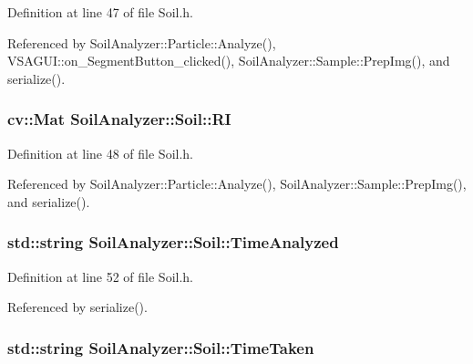 Definition at line 47 of file Soil.\+h.



Referenced by Soil\+Analyzer\+::\+Particle\+::\+Analyze(), V\+S\+A\+G\+U\+I\+::on\+\_\+\+Segment\+Button\+\_\+clicked(), Soil\+Analyzer\+::\+Sample\+::\+Prep\+Img(), and serialize().

\hypertarget{class_soil_analyzer_1_1_soil_abe8693b60a3d88433ffb8255b8d260c3}{}
\subsubsection[{R\+I}]{\setlength{\rightskip}{0pt plus 5cm}cv\+::\+Mat Soil\+Analyzer\+::\+Soil\+::\+R\+I}\label{class_soil_analyzer_1_1_soil_abe8693b60a3d88433ffb8255b8d260c3}


Definition at line 48 of file Soil.\+h.



Referenced by Soil\+Analyzer\+::\+Particle\+::\+Analyze(), Soil\+Analyzer\+::\+Sample\+::\+Prep\+Img(), and serialize().

\hypertarget{class_soil_analyzer_1_1_soil_a3c1c025be53aae3cbe858b7a7936d8dd}{}
\subsubsection[{Time\+Analyzed}]{\setlength{\rightskip}{0pt plus 5cm}std\+::string Soil\+Analyzer\+::\+Soil\+::\+Time\+Analyzed}\label{class_soil_analyzer_1_1_soil_a3c1c025be53aae3cbe858b7a7936d8dd}


Definition at line 52 of file Soil.\+h.



Referenced by serialize().

\hypertarget{class_soil_analyzer_1_1_soil_ae459914e6c463e97d1761d791f653b2d}{}
\subsubsection[{Time\+Taken}]{\setlength{\rightskip}{0pt plus 5cm}std\+::string Soil\+Analyzer\+::\+Soil\+::\+Time\+Taken}\label{class_soil_analyzer_1_1_soil_ae459914e6c463e97d1761d791f653b2d}


